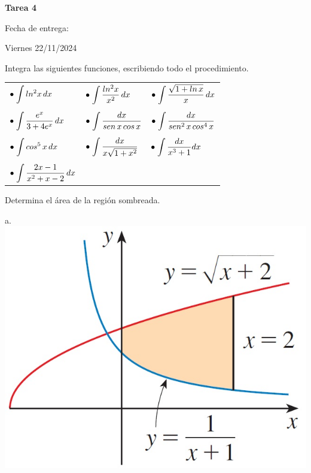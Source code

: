 \documentclass[9pt]{exam}
\begin{document}
\centering


\Large 
\textbf{Tarea 4}

\normalsize
\normalsize
Fecha de entrega: 

Viernes 22/11/2024 



\pointformat{\bfseries\boldmath(\thepoints)}
\vskip10pt

\begin{questions}
   \question Integra las siguientes funciones, escribiendo todo el procedimiento. 
    \vskip10pt
    
    \begin{tabular}{p{5cm}p{5cm}p{5cm}}
         $\bullet\;\mathlarger{\int ln^2x\,dx}$&$\bullet\;\mathlarger{\int \frac{ln^2x}{x^2}\,dx}$&$\bullet\;\mathlarger{\int \frac{\sqrt{1+ln\,x}}{x}\,dx}$  \\
         &\\
         $\bullet\;\mathlarger{\int \dfrac{e^x}{3+4e^x}\,dx}$& $\bullet\;\mathlarger{\int \dfrac{dx}{sen\,x\, cos \,x}}$&$\bullet\;\mathlarger{\int \dfrac{dx}{sen^2 \,x\, cos^4 \,x}}$ \\
         &\\
         $\bullet\;\mathlarger{\int cos^5\, x\, dx}$& $\bullet\;\mathlarger{\int \dfrac{dx}{x\sqrt{1+x^2}}}$&$\bullet\;\mathlarger{\int \dfrac{dx}{x^3 +1}dx}$ \\
         &\\
         $\bullet\;\mathlarger{\int \dfrac{2x-1}{x^2+x-2}}\, dx$
    \end{tabular}{}
   \vskip10pt  
    \question Determina el área de la región sombreada.
    \begin{multicols}{2}
    a. \includegraphics[scale=.3]{T-E3_1.jpg}
    

\end{multicols}
\end{questions}
\end{document}
